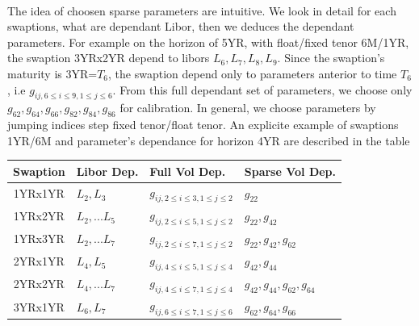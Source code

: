 \documentclass[a4paper,10pt]{article}
\begin{document}
\paragraph{} The idea of choosen sparse parameters are intuitive. We look in detail for each swaptions, what are dependant Libor, then we deduces the dependant parameters. For example on the horizon of 5YR, with float/fixed tenor 6M/1YR, the swaption 3YRx2YR depend to libors $L_6,L_7,L_8,L_9$. Since the swaption's maturity is 3YR=$T_6$, the swaption depend only to parameters anterior to time $T_6$, i.e $g_{ij, 6\leq i\leq 9,1\leq j\leq6}$. From this full dependant set of parameters, we choose only $g_{62},g_{64},g_{66},g_{82},g_{84},g_{86}$ for calibration. In general, we choose parameters by jumping indices step fixed tenor/float tenor. An explicite example of swaptions 1YR/6M and parameter's dependance for horizon 4YR are described in the table
\begin{center}
\begin{tabular}{||c||l|l|l|}
\hline
Swaption & Libor Dep.   & Full Vol Dep. & Sparse Vol Dep. \\
\hline
1YRx1YR  & $L_2, L_3$   & $g_{ij, 2\leq i\leq 3,1\leq j\leq2}$& $g_{22}$\\
\hline
1YRx2YR  & $L_2,...L_5$ & $g_{ij, 2\leq i\leq 5,1\leq j\leq2}$& $g_{22},g_{42}$ \\
\hline
1YRx3YR  & $L_2,...L_7$ & $g_{ij, 2\leq i\leq 7,1\leq j\leq2}$& $g_{22},g_{42},g_{62}$ \\
\hline
2YRx1YR  & $L_4, L_5$   & $g_{ij, 4\leq i\leq 5,1\leq j\leq4}$& $g_{42},g_{44}$ \\
\hline
2YRx2YR  & $L_4,...L_7$ & $g_{ij, 4\leq i\leq 7,1\leq j\leq4}$& $g_{42},g_{44},g_{62},g_{64}$\\
\hline
3YRx1YR  & $L_6, L_7$   & $g_{ij, 6\leq i\leq 7,1\leq j\leq6}$& $g_{62},g_{64},g_{66}$ \\
\hline
\end{tabular} 
\end{center}
\end{document}
